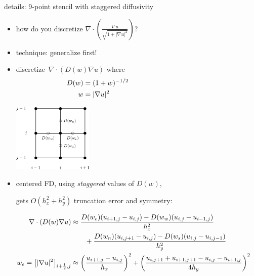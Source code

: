 \documentclass[10pt,
               svgnames,
               hyperref={colorlinks,citecolor=DeepPink4,linkcolor=FireBrick,urlcolor=Maroon},
               usepdftitle=false]{beamer}
\newcommand{\grad}{\nabla}
\newcommand{\Div}{\nabla \cdot}
\newcommand{\ds}{\displaystyle}
\begin{document}
\begin{frame}{details: 9-point stencil with staggered diffusivity}
\begin{itemize}
\item how do you discretize $\ds \Div \left(\frac{\grad u}{\sqrt{1 + |\grad u|^2}}\right)$?

\medskip
\item technique: generalize first!
\item discretize \,$\ds \Div \left(D(w) \grad u\right)$ where
\begin{align*}
D(w) &= (1+w)^{-1/2} \hspace{40mm} \\
w &= |\grad u|^2
\end{align*}

\vspace{-24mm}
\hfill \includegraphics[width=0.3\textwidth]{images/msboxstencil.png}

\vspace{-8mm}
\item centered FD, using \emph{staggered} values of $D(w)$,

gets $O(h_x^2+h_y^2)$ truncation error and symmetry:

{\small
\begin{align*}
\Div \left(D(w) \grad u\right) &\approx \frac{D(w_e) (u_{i+1,j} - u_{i,j}) - D(w_w) (u_{i,j} - u_{i-1,j})}{h_x^2} \\
    &\qquad + \frac{D(w_n) (u_{i,j+1} - u_{i,j}) - D(w_s) (u_{i,j} - u_{i,j-1})}{h_y^2} \\
w_e = \left[|\grad u|^2\right]_{i+\frac{1}{2},j} &\approx \left(\frac{u_{i+1,j} - u_{i,j}}{h_x}\right)^2 + \left(\frac{u_{i,j+1} + u_{i+1,j+1} - u_{i,j} - u_{i+1,j}}{4 h_y}\right)^2 \hspace{10mm}
\end{align*}
}
\end{itemize}
\end{frame}
\end{document}
